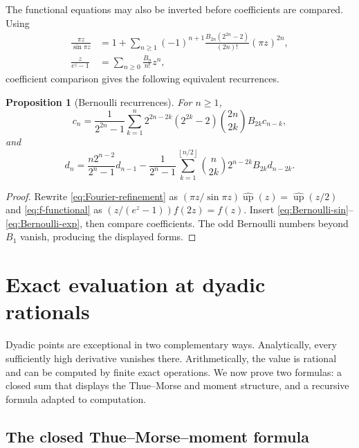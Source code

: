 \documentclass[11pt,oneside]{article}
\newtheorem{proposition}[theorem]{Proposition}
\theoremstyle{definition}
\theoremstyle{remark}
\newcommand{\upf}{\operatorname{up}}
\newcommand{\Fourier}{\widehat{\upf}}
\newcommand{\floor}[1]{\left\lfloor#1\right\rfloor}
\begin{document}
The functional equations may also be inverted before coefficients are compared.
Using
\begin{align}
  \frac{\pi z}{\sin\pi z}
  &=1+\sum_{n\ge1}(-1)^{n+1}
  \frac{B_{2n}(2^{2n}-2)}{(2n)!}(\pi z)^{2n},
  \label{eq:Bernoulli-sin}\\
  \frac{z}{e^z-1}&=\sum_{n\ge0}\frac{B_n}{n!}z^n,
  \label{eq:Bernoulli-exp}
\end{align}
coefficient comparison gives the following equivalent recurrences.

\begin{proposition}[Bernoulli recurrences]\label{prop:Bernoulli-recurrences}
For $n\ge1$,
\begin{equation}\label{eq:c-Bernoulli}
  c_n=\frac1{2^{2n}-1}\sum_{k=1}^{n}
  2^{2n-2k}(2^{2k}-2)\binom{2n}{2k}B_{2k}c_{n-k},
\end{equation}
and
\begin{equation}\label{eq:d-Bernoulli}
  d_n=\frac{n2^{n-2}}{2^n-1}d_{n-1}
  -\frac1{2^n-1}\sum_{k=1}^{\floor{n/2}}
  \binom n{2k}2^{n-2k}B_{2k}d_{n-2k}.
\end{equation}
\end{proposition}

\begin{proof}
Rewrite \eqref{eq:Fourier-refinement} as
$(\pi z/\sin\pi z)\Fourier(z)=\Fourier(z/2)$ and
\eqref{eq:f-functional} as
$(z/(e^z-1))f(2z)=f(z)$.  Insert
\eqref{eq:Bernoulli-sin}--\eqref{eq:Bernoulli-exp}, then compare coefficients.
The odd Bernoulli numbers beyond $B_1$ vanish, producing the displayed forms.
\end{proof}

\section{Exact evaluation at dyadic rationals}\label{sec:dyadic}

Dyadic points are exceptional in two complementary ways.  Analytically, every
sufficiently high derivative vanishes there.  Arithmetically, the value is rational
and can be computed by finite exact operations.  We now prove two formulas: a
closed sum that displays the Thue--Morse and moment structure, and a recursive
formula adapted to computation.

\subsection{The closed Thue--Morse--moment formula}
\end{document}
